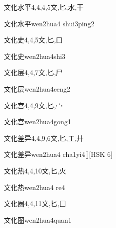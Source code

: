 \begin{Entry}{文化水平}{4,4,4,5}{⽂,⼔,⽔,⼲}
  \begin{Phonetics}{文化水平}{wen2hua4 shui3ping2}
  \end{Phonetics}
\end{Entry}

\begin{Entry}{文化史}{4,4,5}{⽂,⼔,⼝}
  \begin{Phonetics}{文化史}{wen2hua4shi3}
  \end{Phonetics}
\end{Entry}

\begin{Entry}{文化层}{4,4,7}{⽂,⼔,⼫}
  \begin{Phonetics}{文化层}{wen2hua4ceng2}
  \end{Phonetics}
\end{Entry}

\begin{Entry}{文化宫}{4,4,9}{⽂,⼔,⼧}
  \begin{Phonetics}{文化宫}{wen2hua4gong1}
  \end{Phonetics}
\end{Entry}

\begin{Entry}{文化差异}{4,4,9,6}{⽂,⼔,⼯,⼶}
  \begin{Phonetics}{文化差异}{wen2hua4 cha1yi4}[][HSK 6]
  \end{Phonetics}
\end{Entry}

\begin{Entry}{文化热}{4,4,10}{⽂,⼔,⽕}
  \begin{Phonetics}{文化热}{wen2hua4 re4}
  \end{Phonetics}
\end{Entry}

\begin{Entry}{文化圈}{4,4,11}{⽂,⼔,⼞}
  \begin{Phonetics}{文化圈}{wen2hua4quan1}
  \end{Phonetics}
\end{Entry}

